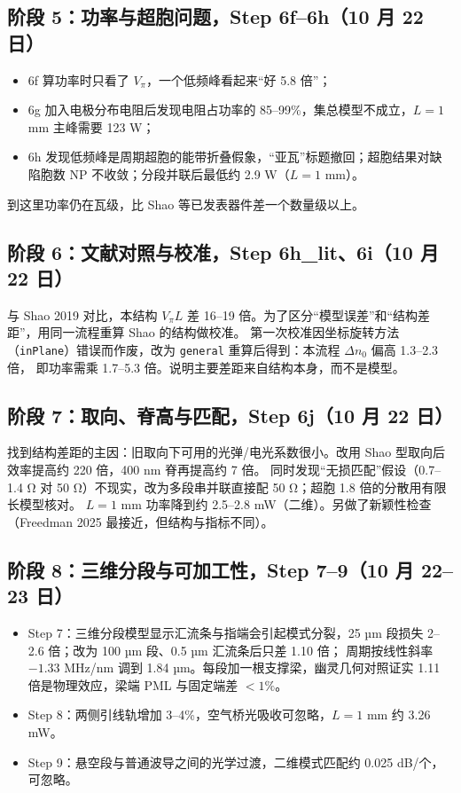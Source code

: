 \documentclass[10pt,a4paper]{article}
\newcommand{\dn}{\Delta n_0}
\begin{document}
\subsection{阶段 5：功率与超胞问题，Step 6f–6h（10 月 22 日）}
\begin{itemize}
\item 6f 算功率时只看了 $V_\pi$，一个低频峰看起来“好 5.8 倍”；
\item 6g 加入电极分布电阻后发现电阻占功率的 85–99\%，集总模型不成立，$L = 1$ mm 主峰需要 123 W；
\item 6h 发现低频峰是周期超胞的能带折叠假象，“亚瓦”标题撤回；超胞结果对缺陷胞数 NP 不收敛；分段并联后最低约 2.9 W（$L=1$ mm）。
\end{itemize}
到这里功率仍在瓦级，比 Shao 等已发表器件差一个数量级以上。

\subsection{阶段 6：文献对照与校准，Step 6h\_lit、6i（10 月 22 日）}
与 Shao 2019 对比，本结构 $V_\pi L$ 差 16–19 倍。为了区分“模型误差”和“结构差距”，用同一流程重算 Shao 的结构做校准。
第一次校准因坐标旋转方法（\texttt{inPlane}）错误而作废，改为 \texttt{general} 重算后得到：本流程 $\dn$ 偏高 1.3–2.3 倍，
即功率需乘 1.7–5.3 倍。说明主要差距来自结构本身，而不是模型。

\subsection{阶段 7：取向、脊高与匹配，Step 6j（10 月 22 日）}
找到结构差距的主因：旧取向下可用的光弹/电光系数很小。改用 Shao 型取向后效率提高约 220 倍，400 nm 脊再提高约 7 倍。
同时发现“无损匹配”假设（0.7–1.4 Ω 对 50 Ω）不现实，改为多段串并联直接配 50 Ω；超胞 1.8 倍的分散用有限长模型核对。
$L = 1$ mm 功率降到约 2.5–2.8 mW（二维）。另做了新颖性检查（Freedman 2025 最接近，但结构与指标不同）。

\subsection{阶段 8：三维分段与可加工性，Step 7–9（10 月 22–23 日）}
\begin{itemize}
\item Step 7：三维分段模型显示汇流条与指端会引起模式分裂，25 µm 段损失 2–2.6 倍；改为 100 µm 段、0.5 µm 汇流条后只差 1.10 倍；
周期按线性斜率 $-1.33$ MHz/nm 调到 1.84 µm。每段加一根支撑梁，幽灵几何对照证实 1.11 倍是物理效应，梁端 PML 与固定端差 $<1\%$。
\item Step 8：两侧引线轨增加 3–4\%，空气桥光吸收可忽略，$L = 1$ mm 约 3.26 mW。
\item Step 9：悬空段与普通波导之间的光学过渡，二维模式匹配约 0.025 dB/个，可忽略。
\end{itemize}
\end{document}
